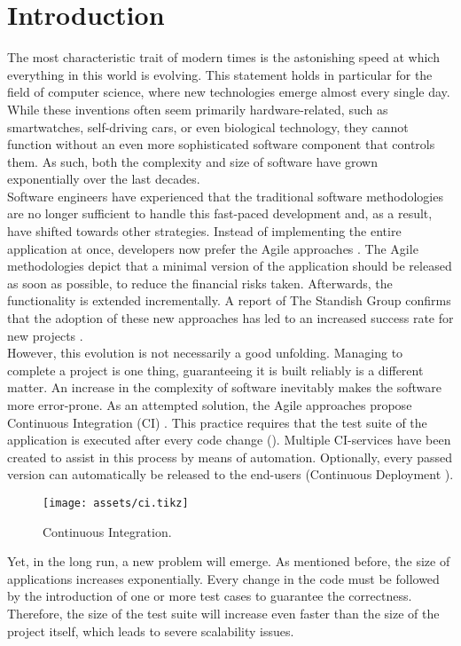 
\section{Introduction}
\noindent The most characteristic trait of modern times is the astonishing speed at which everything in this world is evolving. This statement holds in particular for the field of computer science, where new technologies emerge almost every single day. While these inventions often seem primarily hardware-related, such as smartwatches, self-driving cars, or even biological technology, they cannot function without an even more sophisticated software component that controls them. As such, both the complexity and size of software have grown exponentially over the last decades.\\

\noindent Software engineers have experienced that the traditional software methodologies are no longer sufficient to handle this fast-paced development and, as a result, have shifted towards other strategies. Instead of implementing the entire application at once, developers now prefer the Agile approaches \cite{beck2001agile}. The Agile methodologies depict that a minimal version of the application should be released as soon as possible, to reduce the financial risks taken. Afterwards, the functionality is extended incrementally. A report of The Standish Group confirms that the adoption of these new approaches has led to an increased success rate for new projects \cite{standish2015chaos}.\\

\noindent However, this evolution is not necessarily a good unfolding. Managing to complete a project is one thing, guaranteeing it is built reliably is a different matter. An increase in the complexity of software inevitably makes the software more error-prone. As an attempted solution, the Agile approaches propose Continuous Integration (CI) \cite{SmartJenkinsDefinitive,Myers:2011:AST:2161638}. This practice requires that the test suite of the application is executed after every code change (). Multiple CI-services have been created to assist in this process by means of automation. Optionally, every passed version can automatically be released to the end-users (Continuous Deployment \cite{ciusinggitlab}).

\begin{figure}[h!]
	\centering
	\texttt{[image: assets/ci.tikz]}
	\caption{Continuous Integration.}
	\label{fig:ext-en-ci}
\end{figure}

\noindent Yet, in the long run, a new problem will emerge. As mentioned before, the size of applications increases exponentially. Every change in the code must be followed by the introduction of one or more test cases to guarantee the correctness. Therefore, the size of the test suite will increase even faster than the size of the project itself, which leads to severe scalability issues.
